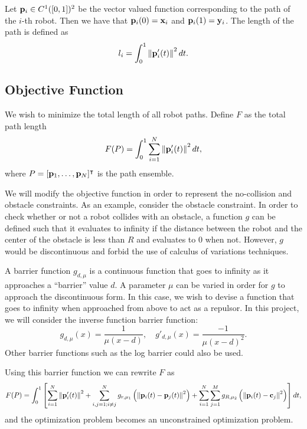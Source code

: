 \documentclass[11pt]{article}
\begin{document}
Let \(\mathbf{p}_i \in C^1([0,1])^2\) be the vector valued function corresponding to the path of the \(i\)-th robot. Then we have that \(\mathbf{p}_i(0) = \mathbf{x}_i\) and \(\mathbf{p}_i(1) = \mathbf{y}_i\). The length of the path is defined as
\begin{equation}
    l_i = \int_0^1 \left\lVert \mathbf{p}_i'(t) \right\rVert^2 dt.
\end{equation}

\subsection{Objective Function}

We wish to minimize the total length of all robot paths. Define \(F\) as the total path length
\begin{equation}
    F(P) = \int_0^1 \sum_{i=1}^{N} \left\lVert \mathbf{p}_i'(t) \right\rVert^2 dt,
\end{equation}
where \(P = [\mathbf{p}_1, \ldots, \mathbf{p}_N]^\intercal\) is the path ensemble.

We will modify the objective function in order to represent the no-collision and obstacle constraints. As an example, consider the obstacle constraint. In order to check whether or not a robot collides with an obstacle, a function \(g\) can be defined such that it evaluates to infinity if the distance between the robot and the center of the obstacle is less than \(R\) and evaluates to 0 when not. However, \(g\) would be discontinuous and forbid the use of calculus of variations techniques.

A barrier function \(g_{d,\mu}\) is a continuous function that goes to infinity as it approaches a ``barrier'' value \(d\). A parameter \(\mu\) can be varied in order for \(g\) to approach the discontinuous form. In this case, we wish to devise a function that goes to infinity when approached from above to act as a repulsor. In this project, we will consider the inverse function barrier function:
    \begin{equation}
        g_{d,\mu}(x) = \frac{1}{\mu(x-d)},
        \quad
        g'_{d,\mu}(x) = \frac{-1}{\mu(x-d)^2}.
    \end{equation}
Other barrier functions such as the log barrier could also be used.

Using this barrier function we can rewrite \(F\) as
\begin{equation}
    F(P) = \int_0^1 \left[ \sum_{i=1}^{N} \left\lVert \mathbf{p}'_i(t) \right\rVert^2 + \sum_{i,j = 1; i \neq j}^{N} g_{r,\mu_1}\left( \left\lVert \mathbf{p}_i(t) - \mathbf{p}_j(t) \right\rVert^2 \right) + \sum_{i=1}^{N} \sum_{j=1}^{M} g_{R,\mu_2}\left( \left\lVert \mathbf{p}_i(t) - \mathbf{c}_j \right\rVert^2 \right) \right] dt,
\end{equation}
and the optimization problem becomes an unconstrained optimization problem.
\end{document}

